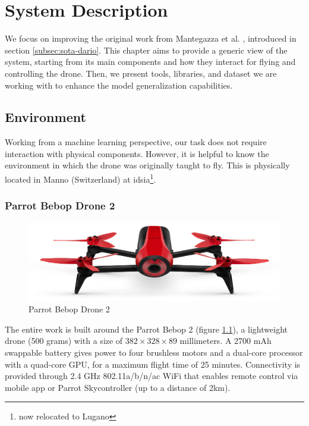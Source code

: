 \chapter{System Description}
\label{chap:system}

\glsresetall

We focus on improving the original work from Mantegazza et al. \cite{mantegazza2019visionbased}, introduced in section \ref{subsec:sota-dario}. This chapter aims to provide a generic view of the system, starting from its main components and how they interact for flying and controlling the drone. Then, we present tools, libraries, and dataset we are working with to enhance the model generalization capabilities.




\section{Environment}
\label{sec:hardware}

Working from a machine learning perspective, our task does not require interaction with physical components. However, it is helpful to know the environment in which the drone was originally taught to fly. This is physically located in Manno (Switzerland) at \gls{idsia}\footnote{now relocated to Lugano}.



\subsection{Parrot Bebop Drone 2}
\label{subsec:bebop}

\begin{figure}[!htb]
	\centering
	\includegraphics[width=.8\textwidth]{"contents/images/03-Parrot-Bebop-2"}
	\caption[Parrot Bebop Drone 2]{Parrot Bebop Drone 2}
	\label{fig:bebop}
\end{figure}

The entire work is built around the Parrot Bebop 2 \cite{bebop} (figure \ref{fig:bebop}), a lightweight drone (500 grams) with a size of $382 \times 328 \times 89$ millimeters. A 2700 mAh swappable battery gives power to four brushless motors and a dual-core processor with a quad-core GPU, for a maximum flight time of 25 minutes. Connectivity is provided through 2.4 GHz 802.11a/b/n/ac WiFi that enables remote control via mobile app or Parrot Skycontroller (up to a distance of 2km).

